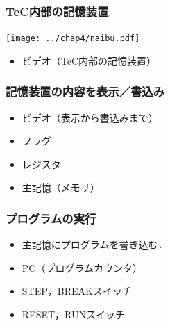 \documentclass{beamer}                 %
\begin{document}
\begin{frame}
  \frametitle{TeC内部の記憶装置}
  \vfill
  \centerline{\texttt{[image: ../chap4/naibu.pdf]}}
  \vfill
  \begin{itemize}
    \item ビデオ（TeC内部の記憶装置）
  \end{itemize}
  \vfill
\end{frame}

\begin{frame}
  \frametitle{記憶装置の内容を表示／書込み}
  \begin{itemize}
    \item ビデオ（表示から書込みまで）
    \item フラグ
    \item レジスタ
    \item 主記憶（メモリ）
  \end{itemize}
  \vfill
  \vfill
  \vfill
\end{frame}

\begin{frame}
  \frametitle{プログラムの実行}
  \begin{itemize}
    \item 主記憶にプログラムを書き込む．
    \item PC（プログラムカウンタ）
    \item STEP，BREAKスイッチ
    \item RESET，RUNスイッチ
  \end{itemize}
  \vfill
  \vfill
  \vfill
\end{frame}
\end{document}
